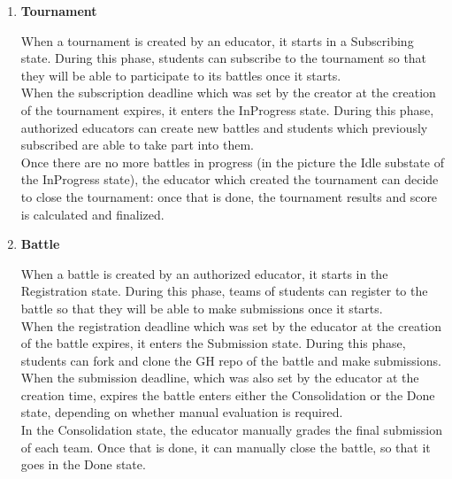 \begin{enumerate}[label=\textbf{SD\arabic*}:,ref=SD\arabic*,leftmargin=1.3cm]
	\item \textbf{Tournament}
	      \begin{adjustbox}{
			      max size={\textwidth}{},
			      caption={Tournament state diagram},
			      label={fig:Tournament state diagram},
			      figure=H}
		      \centering
	      \end{adjustbox}

	      When a tournament is created by an educator, it starts in a Subscribing state.
	      During this phase, students can subscribe to the tournament so that they will
	      be able to participate to its battles once it starts.\\
	      When the subscription deadline which was set by the creator at the creation of
	      the tournament expires, it enters the InProgress state. During this phase,
	      authorized educators can create new battles and students which previously
	      subscribed are able to take part into them. \\
	      Once there are no more battles in progress (in the picture the Idle substate
	      of the InProgress state), the educator which created the tournament can decide
	      to close the tournament: once that is done, the tournament results and score
	      is calculated and finalized.
	      \pagebreak

	\item \textbf{Battle}
	      \begin{adjustbox}{
			      max size={\textwidth}{\textheightwithcaption{1}},
			      caption={Battle state diagram},
			      label={fig:Battle state diagram},
			      figure=H}
		      \centering
		      \puml{puml/battle-state}
	      \end{adjustbox}

	      When a battle is created by an authorized educator, it starts in the Registration state.
	      During this phase, teams of students can register to the battle so that they will
	      be able to make submissions once it starts.\\
	      When the registration deadline which was set by the educator at the creation of
	      the battle expires, it enters the Submission state. During this phase,
	      students can fork and clone the GH repo of the battle and make submissions. \\
	      When the submission deadline, which was also set by the educator at the creation time,
	      expires the battle enters either the Consolidation or the Done state, depending on
	      whether manual evaluation is required. \\
	      In the Consolidation state, the educator manually grades the final submission of each
	      team. Once that is done, it can manually close the battle, so that it goes in the
	      Done state.
\end{enumerate}
\pagebreak

